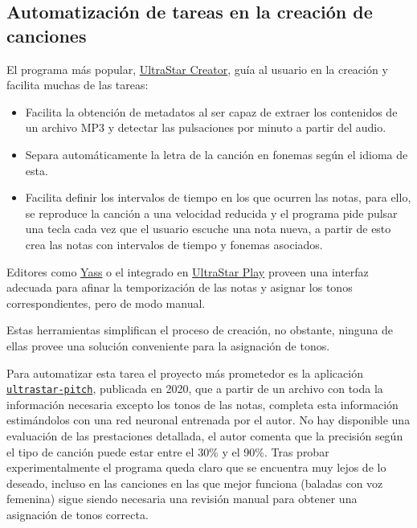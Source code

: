 \subsection{Automatización de tareas en la creación de canciones}

El programa más popular, \href{https://github.com/UltraStar-Deluxe/UltraStar-Creator}{UltraStar Creator}, guía al usuario en la creación y facilita muchas de las tareas:

\begin{itemize}
	\item{Facilita la obtención de metadatos al ser capaz de extraer los contenidos de un archivo MP3 y detectar las pulsaciones por minuto a partir del audio.}
	\item{Separa automáticamente la letra de la canción en fonemas según el idioma de esta.}
	\item{Facilita definir los intervalos de tiempo en los que ocurren las notas, para ello, se reproduce la canción a una velocidad reducida y el programa pide pulsar una tecla cada vez que el usuario escuche una nota nueva, a partir de esto crea las notas con intervalos de tiempo y fonemas asociados.}
\end{itemize}

Editores como \href{https://github.com/sarutasan72/Yass}{Yass} o el integrado en \href{https://usplay.net/#song-editor}{UltraStar Play} proveen una interfaz adecuada para afinar la temporización de las notas y asignar los tonos correspondientes, pero de modo manual.

Estas herramientas simplifican el proceso de creación, no obstante, ninguna de ellas provee una solución conveniente para la asignación de tonos.

Para automatizar esta tarea el proyecto más prometedor es la aplicación\texttt{ \href{https://github.com/paradigmn/ultrastar\_pitch}{ultrastar-pitch}}, publicada en 2020, que a partir de un archivo con toda la información necesaria excepto los tonos de las notas, completa esta información estimándolos con una red neuronal entrenada por el autor. No hay disponible una evaluación de las prestaciones detallada, el autor comenta que la precisión según el tipo de canción puede estar entre el 30\% y el 90\%. Tras probar experimentalmente el programa queda claro que se encuentra muy lejos de lo deseado, incluso en las canciones en las que mejor funciona (baladas con voz femenina) sigue siendo necesaria una revisión manual para obtener una asignación de tonos correcta.

